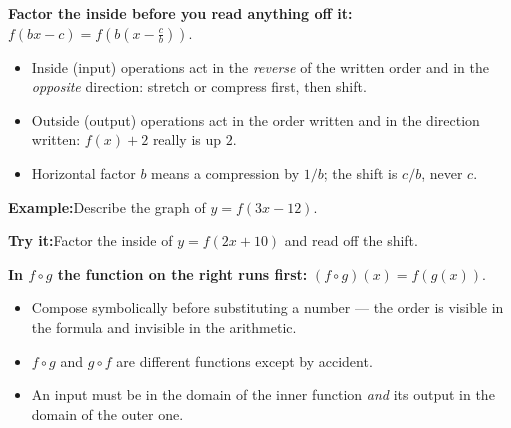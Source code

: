 \documentclass[12pt]{article}
\begin{document}


\begin{formulabox}
\textbf{Factor the inside before you read anything off it:} $f(bx - c) = f\!\left(b\left(x - \tfrac{c}{b}\right)\right)$.
\begin{itemize}[leftmargin=0.8cm, itemsep=0pt, topsep=1pt]
  \item Inside (input) operations act in the \emph{reverse} of the written order and in the \emph{opposite} direction: stretch or compress first, then shift.
  \item Outside (output) operations act in the order written and in the direction written: $f(x) + 2$ really is up $2$.
  \item Horizontal factor $b$ means a compression by $1/b$; the shift is $c/b$, never $c$.
\end{itemize}
\end{formulabox}

\begin{examplebox}
\textbf{Example:}\quad Describe the graph of $y = f(3x - 12)$.
\end{examplebox}

\begin{tryitbox}
\textbf{Try it:}\quad Factor the inside of $y = f(2x + 10)$ and read off the shift.\\[2pt]
\end{tryitbox}


\begin{formulabox}
\textbf{In $f \circ g$ the function on the right runs first:} $(f \circ g)(x) = f(g(x))$.
\begin{itemize}[leftmargin=0.8cm, itemsep=0pt, topsep=1pt]
  \item Compose symbolically before substituting a number --- the order is visible in the formula and invisible in the arithmetic.
  \item $f \circ g$ and $g \circ f$ are different functions except by accident.
  \item An input must be in the domain of the inner function \emph{and} its output in the domain of the outer one.
\end{itemize}
\end{formulabox}
\end{document}
